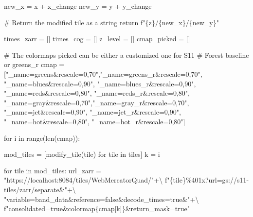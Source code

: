 \documentclass[
  oneside,
  open=any]{scrbook}
\newenvironment{Shaded}{\begin{snugshade}}{\end{snugshade}}
\newcommand{\BuiltInTok}[1]{\textcolor[rgb]{0.00,0.23,0.31}{#1}}
\newcommand{\CommentTok}[1]{\textcolor[rgb]{0.37,0.37,0.37}{#1}}
\newcommand{\ControlFlowTok}[1]{\textcolor[rgb]{0.00,0.23,0.31}{#1}}
\newcommand{\KeywordTok}[1]{\textcolor[rgb]{0.00,0.23,0.31}{#1}}
\newcommand{\NormalTok}[1]{\textcolor[rgb]{0.00,0.23,0.31}{#1}}
\newcommand{\OperatorTok}[1]{\textcolor[rgb]{0.37,0.37,0.37}{#1}}
\newcommand{\SpecialCharTok}[1]{\textcolor[rgb]{0.37,0.37,0.37}{#1}}
\newcommand{\SpecialStringTok}[1]{\textcolor[rgb]{0.13,0.47,0.30}{#1}}
\newcommand{\StringTok}[1]{\textcolor[rgb]{0.13,0.47,0.30}{#1}}
\begin{document}
\begin{Shaded}
\begin{Highlighting}[]
\NormalTok{    new\_x }\OperatorTok{=}\NormalTok{ x }\OperatorTok{+}\NormalTok{ x\_change}
\NormalTok{    new\_y }\OperatorTok{=}\NormalTok{ y }\OperatorTok{+}\NormalTok{ y\_change}

    \CommentTok{\# Return the modified tile as a string}
    \ControlFlowTok{return} \SpecialStringTok{f"}\SpecialCharTok{\{}\NormalTok{z}\SpecialCharTok{\}}\SpecialStringTok{/}\SpecialCharTok{\{}\NormalTok{new\_x}\SpecialCharTok{\}}\SpecialStringTok{/}\SpecialCharTok{\{}\NormalTok{new\_y}\SpecialCharTok{\}}\SpecialStringTok{"}

\NormalTok{times\_zarr }\OperatorTok{=}\NormalTok{ []}
\NormalTok{times\_cog }\OperatorTok{=}\NormalTok{ []}
\NormalTok{z\_level }\OperatorTok{=}\NormalTok{ []}
\NormalTok{cmap\_picked }\OperatorTok{=}\NormalTok{ []}

\CommentTok{\# The colormaps picked can be either a customized one for S11}
\CommentTok{\# Forest baseline or greens\_r}
\NormalTok{cmap }\OperatorTok{=}\NormalTok{ [}\StringTok{"\_name=greens\&rescale=0,70"}\NormalTok{,}\StringTok{"\_name=greens\_r\&rescale=0,70"}\NormalTok{,}
        \StringTok{"\_name=blues\&rescale=0,90"}\NormalTok{, }\StringTok{"\_name=blues\_r\&rescale=0,90"}\NormalTok{,}
        \StringTok{"\_name=reds\&rescale=0,80"}\NormalTok{, }\StringTok{"\_name=reds\_r\&rescale=0,80"}\NormalTok{,}
        \StringTok{"\_name=gray\&rescale=0,70"}\NormalTok{,}\StringTok{"\_name=gray\_r\&rescale=0,70"}\NormalTok{,}
        \StringTok{"\_name=jet\&rescale=0,90"}\NormalTok{, }\StringTok{"\_name=jet\_r\&rescale=0,90"}\NormalTok{,}
        \StringTok{"\_name=hot\&rescale=0,80"}\NormalTok{, }\StringTok{"\_name=hot\_r\&rescale=0,80"}\NormalTok{]}

\ControlFlowTok{for}\NormalTok{ i }\KeywordTok{in} \BuiltInTok{range}\NormalTok{(}\BuiltInTok{len}\NormalTok{(cmap)):}

\NormalTok{    mod\_tiles }\OperatorTok{=}\NormalTok{ [modify\_tile(tile) }\ControlFlowTok{for}\NormalTok{ tile }\KeywordTok{in}\NormalTok{ tiles]}
\NormalTok{    k }\OperatorTok{=}\NormalTok{ i}

    \ControlFlowTok{for}\NormalTok{ tile }\KeywordTok{in}\NormalTok{ mod\_tiles:}
\NormalTok{        url\_zarr }\OperatorTok{=} \StringTok{"https://localhost:8084/tiles/WebMercatorQuad/"}\OperatorTok{+\textbackslash{}}
        \SpecialStringTok{f"}\SpecialCharTok{\{}\NormalTok{tile}\SpecialCharTok{\}}\SpecialStringTok{\%401x?url=gs://s11{-}tiles/zarr/separate\&"}\OperatorTok{+\textbackslash{}}
        \StringTok{"variable=band\_data\&reference=false\&decode\_times=true\&"}\OperatorTok{+\textbackslash{}}
        \SpecialStringTok{f"consolidated=true\&colormap}\SpecialCharTok{\{}\NormalTok{cmap[k]}\SpecialCharTok{\}}\SpecialStringTok{\&return\_mask=true"}


\end{Highlighting}
\end{Shaded}
\end{document}
